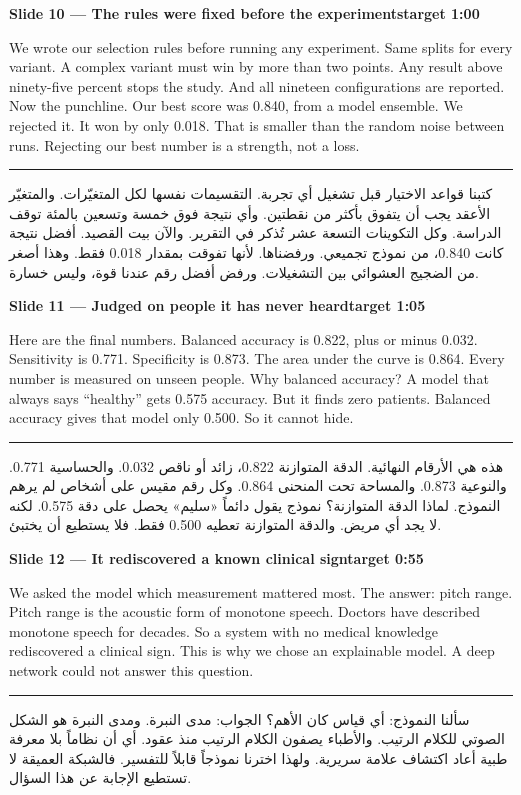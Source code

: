 \documentclass[12pt,a4paper]{article}
\newcommand{\slidehead}[2]{%
\noindent\colorbox{honest!10}{\parbox{\dimexpr\textwidth-2\fboxsep}{%
\textbf{#1}\hfill\textbf{#2}}}\par\vspace{4pt}}
\newcommand{\arstart}{\par\vspace{6pt}\hrule\vspace{6pt}}
\begin{document}
\slidehead{Slide 10 --- The rules were fixed before the experiments}{target 1:00}
We wrote our selection rules before running any experiment.
Same splits for every variant.
A complex variant must win by more than two points.
Any result above ninety-five percent stops the study.
And all nineteen configurations are reported.
Now the punchline.
Our best score was 0.840, from a model ensemble.
We rejected it.
It won by only 0.018.
That is smaller than the random noise between runs.
Rejecting our best number is a strength, not a loss.
\arstart
\begin{Arabic}
كتبنا قواعد الاختيار قبل تشغيل أي تجربة.
التقسيمات نفسها لكل المتغيّرات.
والمتغيّر الأعقد يجب أن يتفوق بأكثر من نقطتين.
وأي نتيجة فوق خمسة وتسعين بالمئة توقف الدراسة.
وكل التكوينات التسعة عشر تُذكر في التقرير.
والآن بيت القصيد.
أفضل نتيجة كانت \textenglish{0.840}، من نموذج تجميعي.
ورفضناها.
لأنها تفوقت بمقدار \textenglish{0.018} فقط.
وهذا أصغر من الضجيج العشوائي بين التشغيلات.
ورفض أفضل رقم عندنا قوة، وليس خسارة.
\end{Arabic}
\clearpage

\slidehead{Slide 11 --- Judged on people it has never heard}{target 1:05}
Here are the final numbers.
Balanced accuracy is \textcolor{honest}{0.822}, plus or minus 0.032.
Sensitivity is 0.771. Specificity is 0.873.
The area under the curve is 0.864.
Every number is measured on unseen people.
Why balanced accuracy?
A model that always says ``healthy'' gets 0.575 accuracy.
But it finds zero patients.
Balanced accuracy gives that model only 0.500.
So it cannot hide.
\arstart
\begin{Arabic}
هذه هي الأرقام النهائية.
الدقة المتوازنة \textenglish{0.822}، زائد أو ناقص \textenglish{0.032}.
والحساسية \textenglish{0.771}. والنوعية \textenglish{0.873}.
والمساحة تحت المنحنى \textenglish{0.864}.
وكل رقم مقيس على أشخاص لم يرهم النموذج.
لماذا الدقة المتوازنة؟
نموذج يقول دائماً «سليم» يحصل على دقة \textenglish{0.575}.
لكنه لا يجد أي مريض.
والدقة المتوازنة تعطيه \textenglish{0.500} فقط.
فلا يستطيع أن يختبئ.
\end{Arabic}
\clearpage

\slidehead{Slide 12 --- It rediscovered a known clinical sign}{target 0:55}
We asked the model which measurement mattered most.
The answer: pitch range.
Pitch range is the acoustic form of monotone speech.
Doctors have described monotone speech for decades.
So a system with no medical knowledge rediscovered a clinical sign.
This is why we chose an explainable model.
A deep network could not answer this question.
\arstart
\begin{Arabic}
سألنا النموذج: أي قياس كان الأهم؟
الجواب: مدى النبرة.
ومدى النبرة هو الشكل الصوتي للكلام الرتيب.
والأطباء يصفون الكلام الرتيب منذ عقود.
أي أن نظاماً بلا معرفة طبية أعاد اكتشاف علامة سريرية.
ولهذا اخترنا نموذجاً قابلاً للتفسير.
فالشبكة العميقة لا تستطيع الإجابة عن هذا السؤال.
\end{Arabic}
\clearpage
\end{document}
